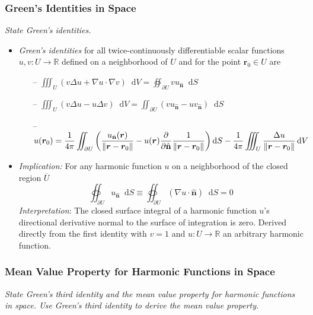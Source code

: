 \documentclass[11pt, a4paper]{article}
\newcommand{\question}[1]{\textit{#1}\vspace{2mm}}
\renewcommand{\grad}{\nabla}
\newcommand{\R}{\mathbb{R}} %
\newcommand{\diff}{\mathop{}\!\mathrm{d}} %
\newcommand{\nhat}{\hat{\mathbf{n}}} %
\begin{document}
\subsubsection{Green's Identities in Space}
\question{State Green's identities.}
\begin{itemize}
	\item \textit{Green's identities} for all twice-continuously differentiable scalar functions $ u, v: U \to \R $ defined on a neighborhood of $ U $ and for the point $ \bm{r}_0 \in U $  are
	\begin{itemize}
		\item[--] $ \displaystyle{\iiint_{U} \left(v \Delta u +  \grad{u} \cdot \grad{v}\right) \diff V = \oiint_{\partial U} v u_{\nhat}\diff S } $\\
		
		\item[--] $ \displaystyle{ \iiint_U \left(v \Delta u - u \Delta v  \right) \diff V = \iint_{\partial U} \left(v u_{\nhat} - u v_{\nhat}  \right)\diff S  } $
		
		\item[--] $ \displaystyle{u(\bm{r}_0) = \frac{1}{4\pi} \iint_{\partial U}\left(\frac{u_{\nhat}(\bm{r})}{\norm{\bm{r} - \bm{r}_0}} - u(\bm{r}) \pdv{}{\nhat}\frac{1}{\norm{\bm{r} - \bm{r}_0}}  \right) \diff S - \frac{1}{4\pi} \iiint_U \frac{\Delta u}{\norm{\bm{r} - \bm{r}_0}} \diff V } $
	\end{itemize}
	
	\item \textit{Implication:} For any harmonic function $ u $ on a neighborhood of the closed region $ \overline{U} $
	\begin{equation*}
		\oiint_{\partial U} u_{\nhat} \diff S \equiv \oiint_{\partial U} (\grad{u} \cdot \nhat )\diff S  = 0
	\end{equation*}
	\textit{Interpretation}: The closed surface integral of a harmonic function $ u $'s directional derivative normal to the surface of integration is zero. Derived directly from the first identity with $ v = 1 $ and $ u : U \to \R $ an arbitrary harmonic function.
\end{itemize}

\subsubsection{Mean Value Property for Harmonic Functions in Space}
\question{State Green's third identity and the mean value property for harmonic functions in space. Use Green's third identity to derive the mean value property.}
\end{document}
